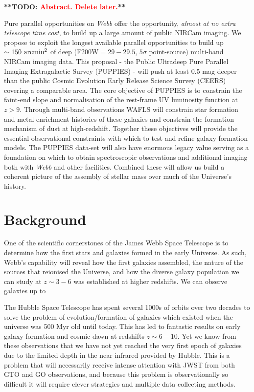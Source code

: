 \documentclass[12pt]{article}
\newcommand{\todo}[1]{\textbf{**TODO: \textcolor{red}{#1}**}}
\begin{document}
%
%

\todo{Abstract. Delete later.}

Pure parallel opportunities on \emph{Webb} offer the opportunity, \emph{almost at no extra telescope time cost}, to build up a large amount of public NIRCam imaging. We propose to exploit the longest available parallel opportunities to build up $\sim 150\ {\rm arcmin^2}$ of deep (F200W$=29-29.5$, $5\sigma$ point-source) multi-band NIRCam imaging data. This proposal - the Public Ultradeep Pure Parallel Imaging Extragalactic Survey (PUPPIES) - will push at least $0.5$ mag deeper than the public Cosmic Evolution Early Release Science Survey (CEERS) covering a comparable area. The core objective of PUPPIES is to constrain the faint-end slope and normalisation of the rest-frame UV luminosity function at $z>9$. Through  multi-band observations WAFLS will constrain star formation and metal enrichment histories of these galaxies and constrain the formation mechanism of dust at high-redshift. Together these objectives will provide the essential observational constraints with  which to test and refine galaxy formation models. The PUPPIES data-set will also have enormous legacy value serving as a foundation on which to obtain spectroscopic observations and additional imaging both with \emph{Webb} and other facilities. Combined these will allow us build a coherent picture of the assembly of stellar mass over much of the Universe's history. 


\clearpage

\justification          %

\section{Background}

One of the scientific cornerstones of the James Webb Space Telescope is to determine how the first stars and galaxies formed in the early Universe. As such, Webb's capability will reveal how the first galaxies assembled, the nature of the sources that reionised the Universe, and how the diverse galaxy population we can study at $z \sim 3-6$ was established at higher redshifts.  We can observe galaxies up to

The Hubble Space Telescope has spent several 1000s of orbits over two decades to solve the problem of evolution/formation of galaxies which existed when the universe was 500 Myr old until today. This has led to fantastic results on early galaxy formation and cosmic dawn at redshifts $z \sim 6-10$. Yet we know from these observations that we have not yet reached the very first epoch of galaxies due to the limited depth in the near infrared provided by Hubble. This is a problem that will necessarily receive intense attention with JWST from both GTO and GO observations, and because this problem is observationally so difficult it will require clever strategies and multiple data collecting methods.
\end{document}
